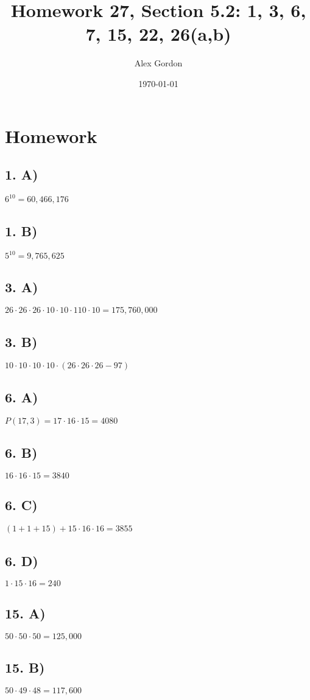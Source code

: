 \documentclass[12]{scrartcl}
\begin{document}
\title{Homework 27, Section 5.2: 1, 3, 6, 7, 15, 22, 26(a,b) }
\author{Alex Gordon}
\date{\today}
\maketitle
\section*{Homework}
\subsection*{1. A)}
$6^{10} = 60,466,176$
\subsection*{1. B)}
$5^{10} = 9,765,625$
\subsection*{3. A)}
$26 \cdot 26 \cdot 26 \cdot 10 \cdot 10 \cdot1 10 \cdot 10 = 175,760,000$
\subsection*{3. B)}
$10 \cdot 10 \cdot 10 \cdot 10 \cdot (26 \cdot 26 \cdot 26 - 97) $
\subsection*{6. A)}
$P(17, 3) = 17 \cdot 16 \cdot 15 = 4080 $
\subsection*{6. B)}
$16 \cdot 16 \cdot 15 = 3840$
\subsection*{6. C)}
$(1 + 1 + 15) + 15 \cdot 16 \cdot 16 = 3855$
\subsection*{6. D)}
$1 \cdot 15 \cdot 16 = 240$
\subsection*{15. A)}
$50 \cdot 50 \cdot 50 = 125,000$
\subsection*{15. B)}
$50 \cdot 49 \cdot 48 = 117,600$
\end{document}
